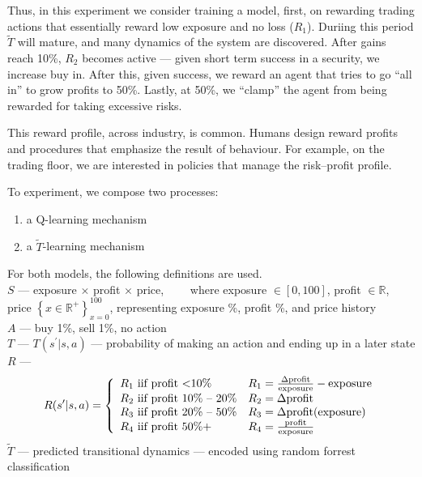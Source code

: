 Thus, in this experiment we consider training a model, first, on rewarding trading actions that essentially reward low exposure and no loss ($R_1$). Duriing this period $\tilde{T}$ will mature, and many dynamics of the system are discovered. After gains reach 10\%, $R_2$ becomes active --- given short term success in a security, we increase buy in. After this, given success, we reward an agent that tries to go ``all in'' to grow profits to 50\%. Lastly, at 50\%, we ``clamp'' the agent from being rewarded for taking excessive risks.

This reward profile, across industry, is common. Humans design reward profits and procedures that emphasize the result of behaviour. For example, on the trading floor, we are interested in policies that manage the risk--profit profile.

To experiment, we compose two processes:
\begin{enumerate}[label=\circled{\arabic*}]
\item a Q-learning mechanism
\item a $\tilde{T}$-learning mechanism
\end{enumerate}
For both models, the following definitions are used.\\

$S$ --- exposure $\times$ profit $\times$ price,$\qquad$ where exposure $\in [0,100]$, profit $\in \mathbb{R}$, price $\left\{ x\in \mathbb{R}^{+} \right\}_{x=0}^{100}$, representing exposure \%, profit \%, and price history \\

$A$ --- buy 1\%, sell 1\%, no action \\

$T$ --- $T( s^{\prime} | s, a )$ --- probability of making an action and ending up in a later state \\

$R$ --- \begin{equation}
R( s^{\prime} | s, a ) = \left\{ 
\begin{array}{ll}
R_1 \text{\ iif profit \textless 10\%} & R_1 = \frac{\Delta\text{profit}}{\text{exposure}}-\text{exposure} \\
R_2 \text{\ iif profit 10\% -- 20\%} & R_2 = \Delta\text{profit} \\
R_3 \text{\ iif profit 20\% -- 50\%} & R_3 = \Delta\text{profit(exposure)} \\
R_4 \text{\ iif profit 50\%+} & R_4 = \frac{\text{profit}}{\text{exposure}}
\end{array}
\right.
\end{equation}
$\tilde{T}$ --- predicted transitional dynamics --- encoded using random forrest classification \\

